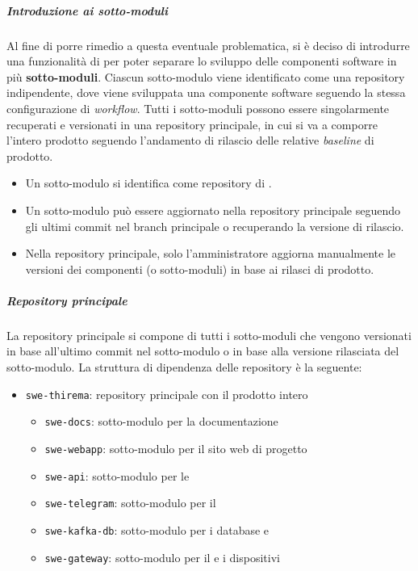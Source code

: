 		\subparagraph{Introduzione ai sotto-moduli}

		Al fine di porre rimedio a questa eventuale problematica, si è deciso di introdurre una funzionalità di  per poter separare lo sviluppo delle componenti software in più \textbf{sotto-moduli}. Ciascun sotto-modulo viene identificato come una repository indipendente, dove viene sviluppata una componente software seguendo la stessa configurazione di \textit{workflow}. 
		Tutti i sotto-moduli possono essere singolarmente recuperati e versionati in una repository principale, in cui si va a comporre l'intero prodotto seguendo l'andamento di rilascio delle relative \textit{baseline} di prodotto.

		\begin{itemize}
			\item Un sotto-modulo si identifica come repository di .
			\item Un sotto-modulo può essere aggiornato nella repository principale seguendo gli ultimi commit nel branch principale o recuperando la versione di rilascio.
			\item Nella repository principale, solo l'amministratore aggiorna manualmente le versioni dei componenti (o sotto-moduli) in base ai rilasci di prodotto.
		\end{itemize}

		\subparagraph{Repository principale}

		La repository principale si compone di tutti i sotto-moduli che vengono versionati in base all'ultimo commit nel sotto-modulo o in base alla versione rilasciata del sotto-modulo.
		La struttura di dipendenza delle repository è la seguente:

		\begin{itemize}
			\item \verb!swe-thirema!: repository principale con il prodotto intero
			\begin{itemize}
				\item \verb!swe-docs!: sotto-modulo per la documentazione
				\item \verb!swe-webapp!: sotto-modulo per il sito web di progetto
				\item \verb!swe-api!: sotto-modulo per le 
				\item \verb!swe-telegram!: sotto-modulo per il 
				\item \verb!swe-kafka-db!: sotto-modulo per i database e 
				\item \verb!swe-gateway!: sotto-modulo per il  e i dispositivi
			\end{itemize}
		\end{itemize}

